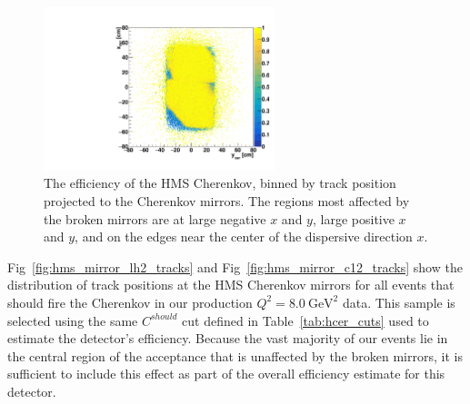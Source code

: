 \begin{figure}[!h]
    \centering
    \includegraphics[width=0.6\textwidth]{chap4/plot_scripts/hCer_eff.pdf}
    \caption[
            The efficiency of the HMS Cherenkov, binned by track position
            projected to the Cherenkov mirrors.]{
            The efficiency of the HMS Cherenkov, binned by track position
            projected to the Cherenkov mirrors.
            The regions most affected by the broken mirrors are at large
            negative $x$ and $y$, large positive $x$ and $y$, and on the edges
            near the center of the dispersive direction $x$.
            }
    \label{fig:hms_mirror_efficiency}
\end{figure}

Fig~\ref{fig:hms_mirror_lh2_tracks} and Fig~\ref{fig:hms_mirror_c12_tracks}
show the distribution of track positions at the HMS Cherenkov mirrors for all
events that should fire the Cherenkov in our production
$Q^2=\SI{8.0}{\giga\electronvolt\squared}$ data.
This sample is selected using the same $C^{should}$ cut defined in
Table~\ref{tab:hcer_cuts} used to estimate the detector's efficiency.
Because the vast majority of our events lie in the central region of the
acceptance that is unaffected by the broken mirrors, it is sufficient to
include this effect as part of the overall efficiency estimate for this
detector.

